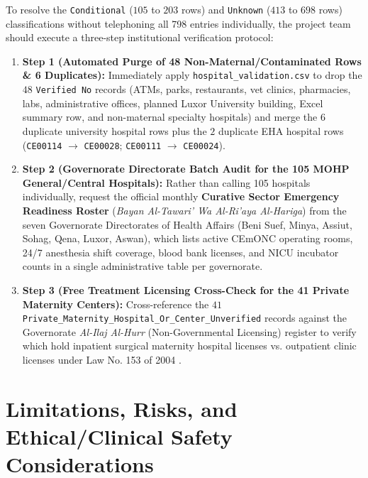 \documentclass[10pt,a4paper]{article}
\begin{document}
To resolve the \texttt{Conditional} ($105$ to $203$ rows) and \texttt{Unknown} ($413$ to $698$ rows) classifications without telephoning all 798 entries individually, the project team should execute a three-step institutional verification protocol:
\begin{enumerate}
    \item \textbf{Step 1 (Automated Purge of 48 Non-Maternal/Contaminated Rows \& 6 Duplicates):} Immediately apply \texttt{hospital\_validation.csv} to drop the $48$ \texttt{Verified No} records (ATMs, parks, restaurants, vet clinics, pharmacies, labs, administrative offices, planned Luxor University building, Excel summary row, and non-maternal specialty hospitals) and merge the $6$ duplicate university hospital rows plus the $2$ duplicate EHA hospital rows (\texttt{CE00114} $\to$ \texttt{CE00028}; \texttt{CE00111} $\to$ \texttt{CE00024}).
    \item \textbf{Step 2 (Governorate Directorate Batch Audit for the 105 MOHP General/Central Hospitals):} Rather than calling 105 hospitals individually, request the official monthly \textbf{Curative Sector Emergency Readiness Roster} (\textit{Bayan Al-Tawari' Wa Al-Ri'aya Al-Hariga}) from the seven Governorate Directorates of Health Affairs (Beni Suef, Minya, Assiut, Sohag, Qena, Luxor, Aswan), which lists active CEmONC operating rooms, 24/7 anesthesia shift coverage, blood bank licenses, and NICU incubator counts in a single administrative table per governorate.
    \item \textbf{Step 3 (Free Treatment Licensing Cross-Check for the 41 Private Maternity Centers):} Cross-reference the $41$ \texttt{Private\_Maternity\_Hospital\_Or\_Center\_Unverified} records against the Governorate \textit{Al-Ilaj Al-Hurr} (Non-Governmental Licensing) register to verify which hold inpatient surgical maternity hospital licenses vs. outpatient clinic licenses under Law No. 153 of 2004 \cite{egypt_law_51_1981_153_2004}.
\end{enumerate}

\section{Limitations, Risks, and Ethical/Clinical Safety Considerations}
\end{document}
